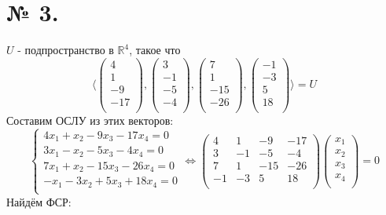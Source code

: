 \documentclass[a4paper,11pt]{report}
\begin{document}
\section{№ 3.}
$U$ - подпространство в $\mathbb{R}^4$, такое что 
\[
\langle
\begin{pmatrix}
4\\
1\\
-9\\
-17\\
\end{pmatrix},
\begin{pmatrix}
3\\
-1\\
-5\\
-4\\
\end{pmatrix},
\begin{pmatrix}
7\\
1\\
-15\\
-26\\
\end{pmatrix},
\begin{pmatrix}
-1\\
-3\\
5\\
18\\
\end{pmatrix}
\rangle
= U
\]
Составим ОСЛУ из этих векторов:\\
\[
\begin{cases}
4x_1 + x_2 - 9x_3 - 17x_4 = 0\\
3x_1 - x_2 - 5x_3 - 4x_4 = 0\\
7x_1 + x_2 - 15x_3 - 26x_4 = 0\\
-x_1 - 3x_2 + 5x_3 + 18x_4 = 0\\
\end{cases}
\Leftrightarrow
\begin{pmatrix}
4 & 1 & -9 & -17\\
3 & -1 & -5 & -4\\
7 & 1 & -15 & -26\\
-1 & -3 & 5 & 18\\
\end{pmatrix}
\begin{pmatrix}
x_1\\
x_2\\
x_3\\
x_4\\
\end{pmatrix}
=
0
\]
Найдём ФСР:\\
\end{document}

